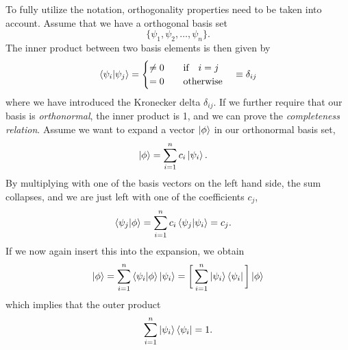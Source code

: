 To fully utilize the notation, orthogonality properties need to be taken into account. Assume that we have a orthogonal basis set 
\begin{equation}
\{\psi_1,\psi_2,\hdots,\psi_n\}.
\end{equation}
The inner product between two basis elements is then given by
\begin{equation}
\braket{\psi_i}{\psi_j}=
\begin{cases}
\neq 0\quad&\text{if}\quad i=j\\
=0\quad&\text{otherwise}
\end{cases}
\quad\equiv\delta_{ij}
\end{equation}
where we have introduced the Kronecker delta $\delta_{ij}$. If we further require that our basis is \textit{orthonormal}, the inner product is 1, and we can prove the \textit{completeness relation}. Assume we want to expand a vector $\ket{\phi}$ in our orthonormal basis set,
\begin{align}
\ket{\phi}&=\sum_{i=1}^nc_i\ket{\psi_i}.
\end{align}
By multiplying with one of the basis vectors on the left hand side, the sum collapses, and we are just left with one of the coefficients $c_j$,
\begin{align}
\braket{\psi_j}{\phi} &= \sum_{i=1}^nc_i\braket{\psi_j}{\psi_i}=c_j.
\end{align}
If we now again insert this into the expansion, we obtain
\begin{equation}
\ket{\phi}=\sum_{i=1}^n\braket{\psi_i}{\phi}\ket{\psi_i}=\bigg[\sum_{i=1}^n\ket{\psi_i}\bra{\psi_i}\bigg]\ket{\phi}
\end{equation}
which implies that the outer product
\begin{equation}
\sum_{i=1}^n\ket{\psi_i}\bra{\psi_i}=1.
\end{equation}

